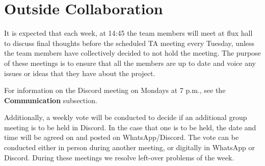 \section{Outside Collaboration}It is expected that each week, at 14:45 the team members will meet at flux hall to discuss final thoughts before the scheduled TA meeting every Tuesday, unless the team members have collectively decided to not hold the meeting. The purpose of these meetings is to ensure that all the members are up to date and voice any issues or ideas that they have about the project. \par
\smallskip
For information on the Discord meeting on Mondays at 7 p.m., see the \textbf{Communication} subsection.\par
\smallskip
Additionally, a weekly vote will be conducted to decide if an additional group meeting is to be held in Discord. In the case that one is to be held, the date and time will be agreed on and posted on WhatsApp/Discord. The vote can be conducted either in person during another meeting, or digitally in WhatsApp or Discord. During these meetings we resolve left-over problems of the week.\par
\smallskip
